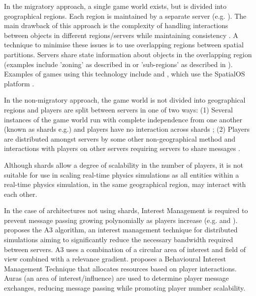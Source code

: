 In the migratory approach, a single game world exists, but is divided into geographical regions. Each region is maintained by a separate server (e.g. \cite{AnOverlappingArchitecture, ScalabilityIssues, LoadBalancingForDistributedVR, ALoadBalancingAlgorithm, SpatialOS}). The main drawback of this approach is the complexity of handling interactions between objects in different regions/servers while maintaining consistency \cite{P2PForMMOs}. A technique to minimise these issues is to use overlapping regions between spatial partitions. Servers share state information about objects in the overlapping region (examples include 'zoning' as described in \cite{AnOverlappingArchitecture} or 'sub-regions' as described in \cite{ScalabilityIssues}). Examples of games using this technology include \cite{Vanishin30:online} and \cite{WorldsAd48:online}, which use the SpatialOS platform \cite{SpatialOS}. %
 
In the non-migratory approach, the game world is not divided into geographical regions and players are split between servers in one of two ways: (1) Several instances of the game world run with complete independence from one another (known as shards e.g.\cite{WOW}) and players have no interaction across shards \cite{P2PForMMOs}; (2) Players are distributed amongst servers by some other non-geographical method and interactions with players on other servers requiring servers to share messages \cite{LoadBalancingforMMOs}.

Although shards allow a degree of scalability in the number of players, it is not suitable for use in scaling real-time physics simulations as all entities within a real-time physics simulation, in the same geographical region, may interact with each other.

In the case of architectures not using shards, Interest Management is required to prevent message passing growing polynomially as players increase (e.g. \cite{Bezerra2008} and \cite{LoadBalancingforMMOs}).
\cite{Bezerra2008} proposes the A3 algorithm, an interest management technique for distributed simulations aiming to significantly reduce the necessary bandwidth required between servers. A3 uses a combination of a circular area of interest and field of view combined with a relevance gradient. \cite{LoadBalancingforMMOs} proposes a Behavioural Interest Management Technique that allocates resources based on player interactions. Auras (an area of interest/influence) are used to determine player message exchanges, reducing message passing while promoting player number scalability.

